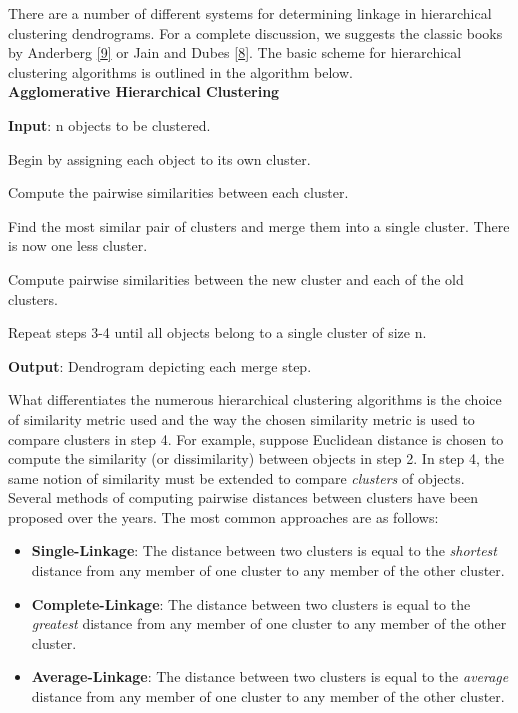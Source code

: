 \documentclass[
]{article}
\providecommand{\tightlist}{%
  \setlength{\itemsep}{0pt}\setlength{\parskip}{0pt}}
\theoremstyle{definition}
\theoremstyle{definition}
\theoremstyle{definition}
\theoremstyle{definition}
\theoremstyle{remark}
\begin{document}
There are a number of different systems for determining linkage in hierarchical clustering dendrograms. For a complete discussion, we suggests the classic books by Anderberg \protect\hyperlink{ref-anderberg}{{[}9{]}} or Jain and Dubes \protect\hyperlink{ref-jainbook}{{[}8{]}}. The basic scheme for hierarchical clustering algorithms is outlined in the algorithm below.\\

\textbf{Agglomerative Hierarchical Clustering}

\textbf{Input}: n objects to be clustered.

Begin by assigning each object to its own cluster.

Compute the pairwise similarities between each cluster.

Find the most similar pair of clusters and merge them into a single cluster. There is now one less cluster.

Compute pairwise similarities between the new cluster and each of the old clusters.

Repeat steps 3-4 until all objects belong to a single cluster of size n.

\textbf{Output}: Dendrogram depicting each merge step.

What differentiates the numerous hierarchical clustering algorithms is the choice of similarity metric used and the way the chosen similarity metric is used to compare clusters in step 4. For example, suppose Euclidean distance is chosen to compute the similarity (or dissimilarity) between objects in step 2. In step 4, the same notion of similarity must be extended to compare \emph{clusters} of objects. Several methods of computing pairwise distances between clusters have been proposed over the years. The most common approaches are as follows:

\begin{itemize}
\tightlist
\item
  \textbf{Single-Linkage}: The distance between two clusters is equal to the \emph{shortest} distance from any member of one cluster to any member of the other cluster.
\item
  \textbf{Complete-Linkage}: The distance between two clusters is equal to the \emph{greatest} distance from any member of one cluster to any member of the other cluster.
\item
  \textbf{Average-Linkage}: The distance between two clusters is equal to the \emph{average} distance from any member of one cluster to any member of the other cluster.
\end{itemize}
\end{document}
